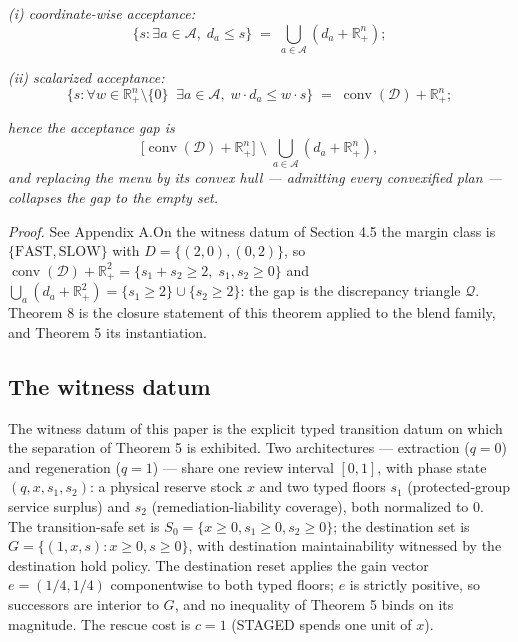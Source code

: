 \documentclass[review,11pt]{elsarticle}
\begin{document}
\emph{(i) coordinate-wise acceptance:}
\[
\{ s : \exists a \in \mathcal{A},\; d_a \le s \}
\;=\; \bigcup_{a \in \mathcal{A}} (d_a + \mathbb{R}^n_+);
\]

\emph{(ii) scalarized acceptance:}
\[
\{ s : \forall w \in \mathbb{R}^n_+ \setminus \{0\} \;\; \exists a \in
\mathcal{A},\; w \cdot d_a \le w \cdot s \}
\;=\; \operatorname{conv}(\mathcal{D}) + \mathbb{R}^n_+;
\]

\emph{hence the acceptance gap is}
\[
\bigl[\operatorname{conv}(\mathcal{D}) + \mathbb{R}^n_+\bigr]
\;\setminus\;
\bigcup_{a \in \mathcal{A}} (d_a + \mathbb{R}^n_+),
\]
\emph{and replacing the menu by its convex hull --- admitting every
convexified plan --- collapses the gap to the empty set.}

\emph{Proof.} See Appendix A.On the witness datum of Section 4.5 the margin class is
\(\{\mathrm{FAST}, \mathrm{SLOW}\}\) with \(D = \{(2,0), (0,2)\}\), so
\(\operatorname{conv}(\mathcal{D}) + \mathbb{R}^2_+ = \{ s_1 + s_2 \ge 2,\; s_1,
s_2 \ge 0\}\) and
\(\bigcup_a (d_a + \mathbb{R}^2_+) = \{ s_1 \ge 2 \} \cup \{ s_2 \ge 2
\}\): the gap is the discrepancy triangle \(\mathcal{Q}\). Theorem 8 is
the closure statement of this theorem applied to the blend family, and
Theorem 5 its instantiation.

\subsection{The witness datum}\label{the-witness-datum}

The witness datum of this paper is the explicit typed transition datum
on which the separation of Theorem 5 is exhibited. Two architectures ---
extraction (\(q = 0\)) and regeneration (\(q = 1\)) --- share one review
interval \([0,1]\), with phase state \((q, x, s_1, s_2)\): a physical
reserve stock \(x\) and two typed floors \(s_1\) (protected-group
service surplus) and \(s_2\) (remediation-liability coverage), both
normalized to \(0\). The transition-safe set is
\(S_0 = \{ x \ge 0, s_1 \ge 0, s_2 \ge 0 \}\); the destination set is
\(G = \{ (1, x, s) : x \ge 0, s \ge 0 \}\), with destination
maintainability witnessed by the destination hold policy. The destination reset applies the gain vector \(e = (1/4, 1/4)\)
componentwise to both typed floors; \(e\) is strictly positive, so successors are interior to \(G\), and no inequality of Theorem 5 binds on its magnitude. The rescue cost is \(c = 1\) (STAGED spends one
unit of \(x\)).
\end{document}
